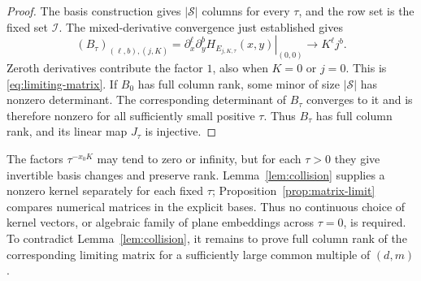 \begin{proof}
The basis construction gives $|\mathcal S|$ columns for every
$\tau$, and the row set is the fixed set $\mathcal I$.
The mixed-derivative convergence just established gives
\[
 (B_\tau)_{(\ell,b),(j,K)}
  =\left.\partial_x^\ell\partial_y^b
          H_{E_{j,K,\tau}}(x,y)\right|_{(0,0)}
  \longrightarrow K^\ell j^b.
\]
Zeroth derivatives contribute the factor $1$, also when $K=0$
or $j=0$. This is \eqref{eq:limiting-matrix}.
If $B_0$ has full column rank, some minor of size
$|\mathcal S|$ has nonzero determinant. The corresponding
determinant of $B_\tau$ converges to it and is therefore nonzero
for all sufficiently small positive $\tau$. Thus $B_\tau$ has
full column rank, and its linear map $J_\tau$ is injective.
\end{proof}

The factors $\tau^{-x_0K}$ may tend to zero or infinity, but for each
$\tau>0$ they give invertible basis changes and preserve rank.
Lemma~\ref{lem:collision} supplies a nonzero kernel separately for
each fixed $\tau$; Proposition~\ref{prop:matrix-limit} compares
numerical matrices in the explicit bases. Thus no continuous choice
of kernel vectors, or algebraic family of plane embeddings across
$\tau=0$, is required. To contradict Lemma~\ref{lem:collision}, it remains
to prove full column rank of the corresponding limiting matrix for a
sufficiently large common multiple of $(d,m)$.
